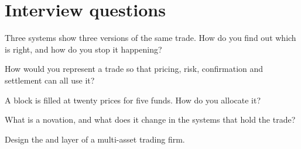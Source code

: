 \section{Interview questions}

\begin{interviewq}\label{iq:pl:trade-capture-and-booking:1}
Three systems show three versions of the same trade. How do you find out which is right, and how do you stop it happening?
\end{interviewq}

\begin{interviewq}\label{iq:pl:trade-capture-and-booking:2}
How would you represent a trade so that pricing, risk, confirmation and settlement can all use it?
\end{interviewq}

\begin{interviewq}\label{iq:pl:trade-capture-and-booking:3}
A block is filled at twenty prices for five funds. How do you allocate it?
\end{interviewq}

\begin{interviewq}\label{iq:pl:trade-capture-and-booking:4}
What is a novation, and what does it change in the systems that hold the trade?
\end{interviewq}

\begin{interviewq}\label{iq:pl:trade-capture-and-booking:5}
Design the  and  layer of a multi-asset trading firm.
\end{interviewq}
